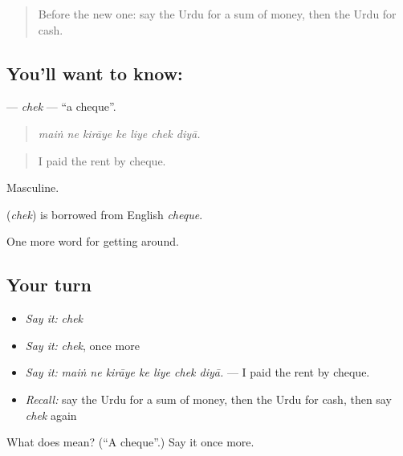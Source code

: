 \begin{quote}
Before the new one: say the Urdu for a sum of money, then the Urdu for cash.
\end{quote}

\subsection*{You'll want to know: }
\textbf{} — \emph{chek} — \textquotedblleft{}a cheque\textquotedblright{}.

\begin{quote}
      
\end{quote}

\begin{quote}
\emph{maiṅ ne kirāye ke liye chek diyā.}
\end{quote}

\begin{quote}
I paid the rent by cheque.
\end{quote}

Masculine.

\begin{cousinweb}
\textbf{} (\emph{chek}) is borrowed from English \emph{cheque}.
\end{cousinweb}

\begin{grammarlens}[title={What you've built}]
One more word for getting around.
\end{grammarlens}

\subsection*{Your turn}
\begin{itemize}
\raggedright
  \item \emph{Say it:} \emph{chek}
  \item \emph{Say it:} \emph{chek}, once more
  \item \emph{Say it:} \emph{maiṅ ne kirāye ke liye chek diyā.} — I paid the rent by cheque.
  \item \emph{Recall:} say the Urdu for a sum of money, then the Urdu for cash, then say \emph{chek} again
\end{itemize}

\begin{tcolorbox}[breakable,colback=teal!4,colframe=teal!35!black,title={Before you move on}]
What does  mean? (\textquotedblleft{}A cheque\textquotedblright{}.) Say it once more.
\end{tcolorbox}
